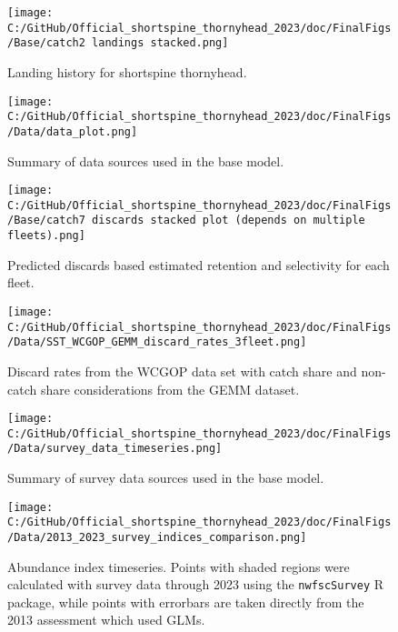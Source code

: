 \documentclass[11pt,
  letterpaper,
]{article}
\begin{document}
\begin{figure}
\centering
\texttt{[image: C:/GitHub/Official\_shortspine\_thornyhead\_2023/doc/FinalFigs/Base/catch2 landings stacked.png]}
\caption{Landing history for shortspine thornyhead.\label{fig:catch_hist}}
\end{figure}

\begin{figure}
\centering
\texttt{[image: C:/GitHub/Official\_shortspine\_thornyhead\_2023/doc/FinalFigs/Data/data\_plot.png]}
\caption{Summary of data sources used in the base model.\label{fig:assessment_data_timeseries}}
\end{figure}

\begin{figure}
\centering
\texttt{[image: C:/GitHub/Official\_shortspine\_thornyhead\_2023/doc/FinalFigs/Base/catch7 discards stacked plot (depends on multiple fleets).png]}
\caption{Predicted discards based estimated retention and selectivity for each fleet.\label{fig:disc_hist}}
\end{figure}

\begin{figure}
\centering
\texttt{[image: C:/GitHub/Official\_shortspine\_thornyhead\_2023/doc/FinalFigs/Data/SST\_WCGOP\_GEMM\_discard\_rates\_3fleet.png]}
\caption{Discard rates from the WCGOP data set with catch share and non-catch share considerations from the GEMM dataset.\label{fig:disc_rates_WCGOP}}
\end{figure}

\begin{figure}
\centering
\texttt{[image: C:/GitHub/Official\_shortspine\_thornyhead\_2023/doc/FinalFigs/Data/survey\_data\_timeseries.png]}
\caption{Summary of survey data sources used in the base model.\label{fig:survey_data_timeseries}}
\end{figure}

\begin{figure}
\centering
\texttt{[image: C:/GitHub/Official\_shortspine\_thornyhead\_2023/doc/FinalFigs/Data/2013\_2023\_survey\_indices\_comparison.png]}
\caption{Abundance index timeseries. Points with shaded regions were calculated with survey data through 2023 using the \texttt{nwfscSurvey} R package, while points with errorbars are taken directly from the 2013 assessment which used GLMs.\label{fig:designbasedsurv}}
\end{figure}
\end{document}
